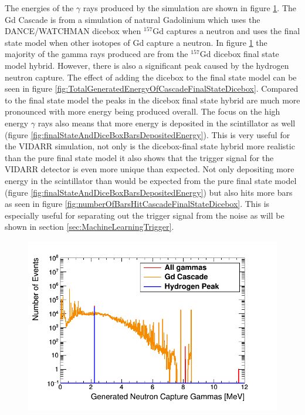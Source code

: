 The energies of the $\gamma$ rays produced by the simulation are shown in figure \ref{fig:gdCascadeVsAllGammas}. The Gd Cascade is from a simulation of natural Gadolinium which uses the DANCE/WATCHMAN dicebox when $^{157}$Gd captures a neutron and uses the final state model when other isotopes of Gd capture a neutron. In figure \ref{fig:gdCascadeVsAllGammas} the majority of the gamma rays produced are from the $^{157}$Gd dicebox final state model hybrid. However, there is also a significant peak caused by the hydrogen neutron capture. The effect of adding the dicebox to the final state model can be seen in figure \ref{fig:TotalGeneratedEnergyOfCascadeFinalStateDicebox}. Compared to the final state model the peaks in the dicebox final state hybrid are much more pronounced with more energy being produced overall. The focus on the high energy $\gamma$ rays also means that more energy is deposited in the scintillator as well (figure \ref{fig:finalStateAndDiceBoxBarsDepositedEnergy}). This is very useful for the VIDARR simulation, not only is the dicebox-final state hybrid more realistic than the pure final state model it also shows that the trigger signal for the VIDARR detector is even more unique than expected. Not only depositing more energy in the scintillator than would be expected from the pure final state model (figure \ref{fig:finalStateAndDiceBoxBarsDepositedEnergy}) but also hits more bars as seen in figure \ref{fig:numberOfBarsHitCascadeFinalStateDicebox}. This is especially useful for separating out the trigger signal from the noise as will be shown in section \ref{sec:MachineLearningTrigger}.

\begin{figure}[htbp]
 \centering
 \includegraphics[width=0.7\linewidth]{Chapter4/Figs/Raster/gadolinium/gdCascadeVsAllGammas.png}
 \label{fig:gdCascadeVsAllGammas}
\end{figure}


